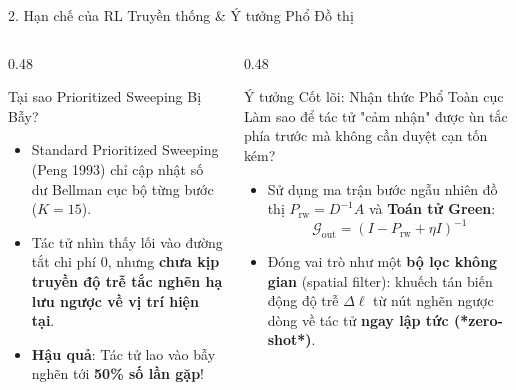 \documentclass[aspectratio=169, 10pt]{beamer}
\begin{document}
\begin{frame}{2. Hạn chế của RL Truyền thống \& Ý tưởng Phổ Đồ thị}
    \begin{columns}[T]
        \begin{column}{0.48\textwidth}
            \begin{alertblock}{Tại sao Prioritized Sweeping Bị Bẫy?}
                \begin{itemize}
                    \item Standard Prioritized Sweeping (Peng 1993) chỉ cập nhật số dư Bellman cục bộ từng bước ($K=15$).
                    \item Tác tử nhìn thấy lối vào đường tắt chi phí $0$, nhưng \textbf{chưa kịp truyền độ trễ tắc nghẽn hạ lưu ngược về vị trí hiện tại}.
                    \item \textbf{Hậu quả}: Tác tử lao vào bẫy nghẽn tới \alert{\textbf{50\% số lần gặp}}!
                \end{itemize}
            \end{alertblock}
        \end{column}
        
        \begin{column}{0.48\textwidth}
            \begin{exampleblock}{Ý tưởng Cốt lõi: Nhận thức Phổ Toàn cục}
                Làm sao để tác tử "cảm nhận" được ùn tắc phía trước mà không cần duyệt cạn tốn kém?
                \begin{itemize}
                    \item Sử dụng ma trận bước ngẫu nhiên đồ thị $P_{\text{rw}} = D^{-1}A$ và \textbf{Toán tử Green}:
                    \[
                        \mathcal{G}_{\text{out}} = (I - P_{\text{rw}} + \eta I)^{-1}
                    \]
                    \item Đóng vai trò như một \textbf{bộ lọc không gian} (spatial filter): khuếch tán biến động độ trễ $\Delta \ell$ từ nút nghẽn ngược dòng về tác tử \textbf{ngay lập tức (*zero-shot*)}.
                \end{itemize}
            \end{exampleblock}
        \end{column}
    \end{columns}
\end{frame}
\end{document}
